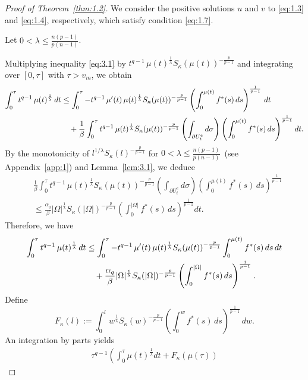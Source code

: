 \documentclass[11pt]{article}
\numberwithin{equation}{section}
\theoremstyle{definition}
\theoremstyle{remark}
\begin{document}
\begin{proof}[Proof of Theorem~\ref{thm:1.2}]
  We consider the positive solutions $u$ and $v$ to \eqref{eq:1.3} and \eqref{eq:1.4}, respectively, 
  which satisfy condition \eqref{eq:1.7}.

Let $0 < \lambda\le \frac{n(p-1)}{p(n-1)}$.

Multiplying inequality \eqref{eq:3.1} by
$t^{q-1}\,\mu(t)^{\frac{1}{\lambda}}S_\kappa(\mu(t))^{-\frac{p}{p-1}}$ and integrating over $[0,\tau]$ with $\tau>v_m$, we obtain
\begin{align*}
\int_0^\tau t^{q-1}\,\mu(t)^{\frac{1}{\lambda}}\,dt
&\le
\int_0^\tau
-t^{q-1}\,\mu'(t)\,\mu(t)^{\frac{1}{\lambda}}S_\kappa(\mu(t))^{-\frac{p}{p-1}}
\left(\int_0^{\mu(t)} f^*(s)\,ds\right)^{\frac{1}{p-1}}\,dt
\notag\\
&\quad
+\frac{1}{\beta}
\int_0^\tau
t^{q-1}\,\mu(t)^{\frac{1}{\lambda}}S_\kappa(\mu(t))^{-\frac{p}{p-1}}
\left(\int_{\partial U_t^e} d\sigma\right)
\left(\int_0^{\mu(t)} f^*(s)\,ds\right) ^\frac{1}{p-1}dt.
\end{align*}
\noindent
By the monotonicity of $l^{1/\lambda}S_\kappa(l)^{-\frac{p}{p-1}}$ for $0 < \lambda\le \frac{n(p-1)}{p(n-1)}$~(see Appendix~\ref{app:1}) and Lemma~\ref{lem:3.1}, we deduce
\begin{align*}
&\frac{1}{\beta}
\int_0^\tau t^{q-1}\,\mu(t)^{\frac{1}{\lambda}}S_\kappa(\mu(t))^{-\frac{p}{p-1}}
\left(\int_{\partial U_t^e} d\sigma\right)
\left(\int_0^{\mu(t)} f^*(s)\,ds\right) ^\frac{1}{p-1}
\\
&\le
\frac{\alpha_q}{\beta}
|\Omega|^{\frac{1}{\lambda}}S_\kappa(|\Omega|)^{-\frac{p}{p-1}}
\left(\int_0^{|\Omega|} f^*(s)\,ds\right)^{\frac{1}{p-1}}dt.
\end{align*}
Therefore, we have
\begin{align}\label{eq:3.5}
\int_0^\tau t^{q-1}\,\mu(t)^{\frac{1}{\lambda}}\,dt
&\le
\int_0^\tau
-t^{q-1}\,\mu'(t)\,\mu(t)^{\frac{1}{\lambda}}S_\kappa(\mu(t))^{-\frac{p}{p-1}}
\int_0^{\mu(t)} f^*(s)\,ds\,dt
\notag\\
&\quad
+\frac{\alpha_q}{\beta}
|\Omega|^{\frac{1}{\lambda}}S_\kappa(|\Omega|)^{-\frac{p}{p-1}}
\left(\int_0^{|\Omega|} f^*(s)\,ds\right)^{\frac{1}{p-1}}.
\end{align}
Define
\[
F_\kappa(l)
:=
\int_0^l
w^{\frac{1}{\lambda}}S_\kappa(w)^{-\frac{p}{p-1}}
\left(\int_0^w f^*(s)\,ds\right)^\frac{1}{p-1}\,dw.
\]
An integration by parts yields
\begin{align*}
\tau^{q-1}\left(
  \int_0^\tau \mu(t)^\frac{1}{\lambda}dt + F_\kappa(\mu(\tau))

\end{align*}
\end{proof}
\end{document}
